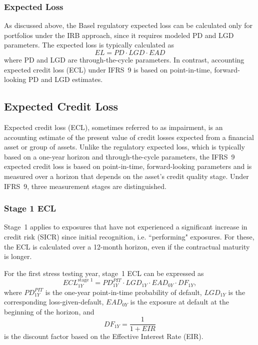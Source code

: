 \documentclass[11pt,a4paper]{article}
\begin{document}
\subsubsection{Expected Loss}

As discussed above, the Basel regulatory expected loss can be calculated only for portfolios under the IRB approach, since it requires modeled PD and LGD parameters. The expected loss is typically calculated as
\[
EL = PD \cdot LGD \cdot EAD
\]
where PD and LGD are through-the-cycle parameters. In contrast, accounting expected credit loss (ECL) under IFRS~9 is based on point-in-time, forward-looking PD and LGD estimates.

\subsection{Expected Credit Loss}

Expected credit loss (ECL), sometimes referred to as impairment, is an accounting estimate of the present value of credit losses expected from a financial asset or group of assets. Unlike the regulatory expected loss, which is typically based on a one-year horizon and through-the-cycle parameters, the IFRS~9 expected credit loss is based on point-in-time, forward-looking parameters and is measured over a horizon that depends on the asset's credit quality stage. Under IFRS~9, three measurement stages are distinguished.

\subsubsection{Stage 1 ECL}

Stage~1 applies to exposures that have not experienced a significant increase in credit risk (SICR) since initial recognition, i.e. ``performing" exposures. For these, the ECL is calculated over a 12-month horizon, even if the contractual maturity is longer.

For the first stress testing year, stage~1 ECL can be expressed as
\begin{equation}
ECL_{1Y}^{\text{stage 1}} = PD_{1Y}^{PIT} \cdot LGD_{1Y} \cdot EAD_{0Y} \cdot DF_{1Y},
\end{equation}
where $PD_{1Y}^{PIT}$ is the one-year point-in-time probability of default, $LGD_{1Y}$ is the corresponding loss-given-default, $EAD_{0Y}$ is the exposure at default at the beginning of the horizon, and 
\[
DF_{1Y} = \frac{1}{1 + EIR}
\]
is the discount factor based on the Effective Interest Rate (EIR).  
\end{document}

